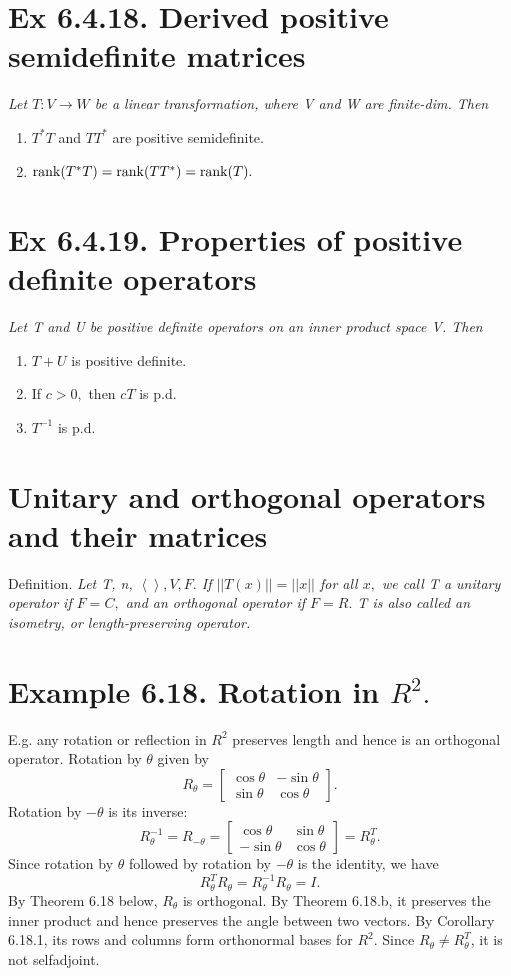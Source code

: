\documentclass[12pt,english]{article}
\begin{document}
\section{Ex 6.4.18. Derived positive semidefinite matrices}

\emph{Let $T:V\longrightarrow W$ be a linear transformation, where
V and W are finite-dim. Then}
\begin{enumerate}
\item $T^{*}T$ and $TT^{*}$ are positive semidefinite.
\item $\operatorname{rank}(T^{*}T)=\operatorname{rank}(TT^{*})=\operatorname{rank}(T).$
\end{enumerate}

\section{Ex 6.4.19. Properties of positive definite operators}

\emph{Let T and U be positive definite operators on an inner product
space V. Then}
\begin{enumerate}
\item $T+U$ is positive definite.
\item If $c>0,$ then $cT$ is p.d.
\item $T^{-1}$ is p.d.
\end{enumerate}

\section{Unitary and orthogonal operators and their matrices}

Definition. \emph{Let T, n, $\left\langle \right\rangle ,V,F.$ If
$\left|\left|T(x)\right|\right|=\left|\left|x\right|\right|$ for
all $x,$ we call T a unitary operator if $F=C,$ and an orthogonal
operator if $F=R.$ T is also called an isometry, or length-preserving
operator.}

\section{Example 6.18. Rotation in $R^{2}.$ }

E.g. any rotation or reflection in $R^{2}$ preserves length and hence
is an orthogonal operator. Rotation by $\theta$ given by
\[
R_{\theta}=\begin{bmatrix}\cos\theta & -\sin\theta\\
\sin\theta & \cos\theta
\end{bmatrix}.
\]
Rotation by $-\theta$ is its inverse:
\[
R_{\theta}^{-1}=R_{-\theta}=\begin{bmatrix}\cos\theta & \sin\theta\\
-\sin\theta & \cos\theta
\end{bmatrix}=R_{\theta}^{T}.
\]
Since rotation by $\theta$ followed by rotation by $-\theta$ is
the identity, we have
\[
R_{\theta}^{T}R_{\theta}=R_{\theta}^{-1}R_{\theta}=I.
\]
By Theorem 6.18 below, $R_{\theta}$ is orthogonal. By Theorem 6.18.b,
it preserves the inner product and hence preserves the angle between
two vectors. By Corollary 6.18.1, its rows and columns form orthonormal
bases for $R^{2}.$ Since $R_{\theta}\neq R_{\theta}^{T}$, it is
not selfadjoint.
\end{document}
